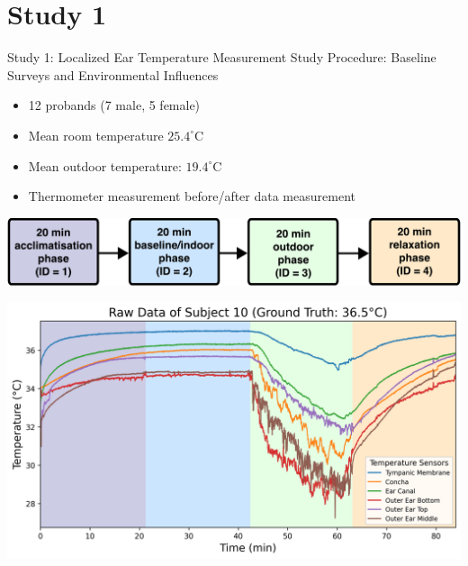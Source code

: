 \documentclass[en]{sdqbeamer}
\begin{document}
\section{Study 1}
\begin{frame}{Study 1: Localized Ear Temperature Measurement Study Procedure: Baseline Surveys and Environmental Influences}
    \begin{itemize}
        \item 12 probands (7 male, 5 female)
        \item Mean room temperature $25.4^\circ\text{C}$
        \item Mean outdoor temperature: $19.4^\circ\text{C}$
        \item Thermometer measurement before/after data measurement
    \end{itemize}
    \begin{center}
        \includegraphics[width=0.95\linewidth]{../thesis-doc/images/study1/Procedure_short.pdf}
    \end{center}
\end{frame}

\begin{frame}
    \begin{center}
        \includegraphics[width=0.9\linewidth]{../thesis-doc/images/study1/Logging_person_10_0smoothed_raw_data.png}
    \end{center}
\end{frame}
\end{document}
